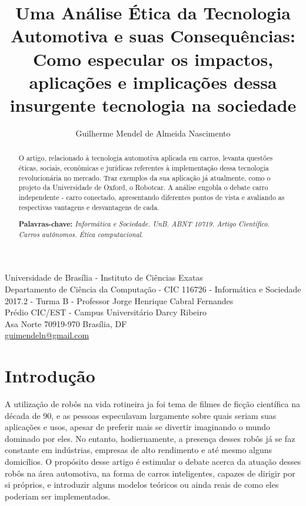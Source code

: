 \documentclass[12pt]{article}
\begin{document}
 
	\title{Uma Análise Ética da Tecnologia Automotiva e suas Consequências: Como especular os impactos, aplicações e implicações dessa insurgente tecnologia na sociedade}
	
	\author{Guilherme Mendel de Almeida Nascimento}
	
	\renewcommand{\tablename}{Quadro}
	
	\newcommand{\address}{
			\begin{center}
				\footnotesize
				Universidade de Brasília - Instituto de Ciências Exatas\\  Departamento de Ciência da Computação - CIC 116726 - Informática e Sociedade \\
				2017.2 - Turma B - Professor Jorge Henrique Cabral Fernandes\\ Prédio CIC/EST - Campus Universitário Darcy Ribeiro \\Asa Norte 70919-970 Brasília, DF\\
				\href{mailto:guimendeln@gmail.com}{guimendeln@gmail.com}
			\end{center}
	}
	
	\maketitle
	\address
	
	\begin{abstract} 
		O artigo, relacionado à tecnologia automotiva aplicada em carros, levanta questões éticas, sociais, econômicas e jurídicas referentes à implementação dessa tecnologia revolucionária no mercado. Traz exemplos da sua aplicação já atualmente, como o projeto da Universidade de Oxford, o Robotcar. A análise engobla o debate carro independente - carro conectado, apresentando diferentes pontos de vista e avaliando as respectivas vantagens e desvantagens de cada.
		
		\textbf{Palavras-chave:} \textit{Informática e Sociedade. UnB. ABNT 10719. Artigo Científico. Carros autônomos. Ética computacional.}
	\end{abstract}
	
	\section{Introdução}
	
		A utilização de robôs na vida rotineira ja foi tema de filmes de ficção científica na década de 90, e as pessoas especulavam largamente sobre quais seriam suas aplicações e usos, apesar de preferir mais se divertir imaginando o mundo dominado por eles. No entanto, hodiernamente, a presença desses robôs já se faz constante em indústrias, empresas de alto rendimento e até mesmo alguns domicílios. O propósito desse artigo é estimular o debate acerca da atuação desses robôs na área automotiva, na forma de carros inteligentes, capazes de dirigir por si próprios, e introduzir alguns modelos teóricos ou ainda reais de como eles poderiam ser implementados.
		
\end{document}
